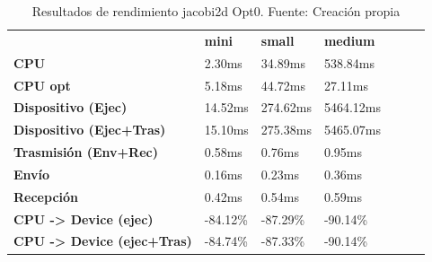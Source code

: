 \begin{table}[H]
    \centering
    \begin{tabular}{lllllll}
    \rowcolor[HTML]{DAE8FC} \ &  \textbf{mini} &  \textbf{	small} &  \textbf{	medium} \\
    \cellcolor[HTML]{DAE8FC} \textbf{CPU} & 2.30ms & 	34.89ms & 	538.84ms \\
    \rowcolor[HTML]{EFEFEF} \cellcolor[HTML]{DAE8FC} \textbf{CPU opt} & 5.18ms & 	44.72ms & 	27.11ms \\
    \cellcolor[HTML]{DAE8FC} \textbf{Dispositivo (Ejec)} & 14.52ms & 	274.62ms & 	5464.12ms \\
    \rowcolor[HTML]{EFEFEF} \cellcolor[HTML]{DAE8FC} \textbf{Dispositivo (Ejec+Tras)} & 15.10ms & 	275.38ms & 	5465.07ms \\
    \cellcolor[HTML]{DAE8FC} \textbf{Trasmisión (Env+Rec)} & 0.58ms & 	0.76ms & 	0.95ms \\
    \rowcolor[HTML]{EFEFEF} \cellcolor[HTML]{DAE8FC} \textbf{Envío} & 0.16ms & 	0.23ms & 	0.36ms \\
    \cellcolor[HTML]{DAE8FC} \textbf{Recepción} & 0.42ms & 	0.54ms & 	0.59ms \\
    \rowcolor[HTML]{EFEFEF} \cellcolor[HTML]{DAE8FC} \textbf{CPU -> Device (ejec)} & -84.12\% & 	-87.29\% & 	-90.14\% \\
    \cellcolor[HTML]{DAE8FC} \textbf{CPU -> Device (ejec+Tras)} & -84.74\% & 	-87.33\% & 	-90.14\% \\
    \end{tabular}
    \caption[Resultados de rendimiento jacobi2d Opt0]{{Resultados de rendimiento jacobi2d Opt0. Fuente: Creación propia}}
    \label{table_test_jacobi2d_Opt0_hw_performanceResults}
\end{table}